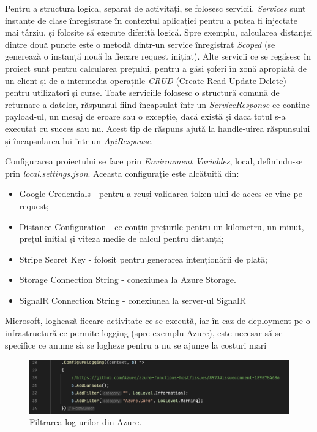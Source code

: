 Pentru a structura logica, separat de activități, se folosesc servicii. \textit{Services} sunt instanțe de clase înregistrate în
contextul aplicației pentru a putea fi injectate mai târziu, și folosite să execute diferită logică.
Spre exemplu, calcularea distanței dintre două puncte este o metodă dintr-un service înregistrat \textit{Scoped} (se generează o instanță nouă
la fiecare request inițiat). Alte servicii ce se regăsesc în proiect sunt pentru calcularea prețului, pentru
a găsi șoferi în zonă apropiată de un client și de a intermedia operațiile \textit{CRUD} (Create Read Update Delete) pentru utilizatori și curse.
Toate serviciile folosesc o structură comună de returnare a datelor, răspunsul fiind încapsulat într-un \textit{ServiceResponse}
ce conține payload-ul, un mesaj de eroare sau o excepție, dacă există și dacă totul s-a executat cu succes sau nu. Acest tip de răspuns
ajută la handle-uirea răspunsului și încapsularea lui într-un \textit{ApiResponse}.

Configurarea proiectului se face prin \textit{Environment Variables}, local, definindu-se prin
\textit{local.settings.json}. Această configurație este alcătuită din:
\begin{itemize}
    \item Google Credentials - pentru a reuși validarea token-ului de acces ce vine pe request;
    \item Distance Configuration - ce conțin prețurile pentru un kilometru, un minut, prețul inițial și viteza medie de calcul pentru distanță;
    \item Stripe Secret Key - folosit pentru generarea intenționării de plată;
    \item Storage Connection String - conexiunea la Azure Storage.
    \item SignalR Connection String - conexiunea la server-ul SignalR
\end{itemize}

Microsoft, loghează fiecare activitate ce se execută, iar în caz de deployment pe o infrastructură ce permite logging (spre exemplu Azure),
este necesar să se specifice ce anume să se logheze pentru a nu se ajunge la costuri mari
\begin{figure}[H]
    \centering
    \includegraphics[width=16cm]{Assets/configLogging.png}
    \caption{Filtrarea log-urilor din Azure.}
    \label{fig:configLogging}
\end{figure}

